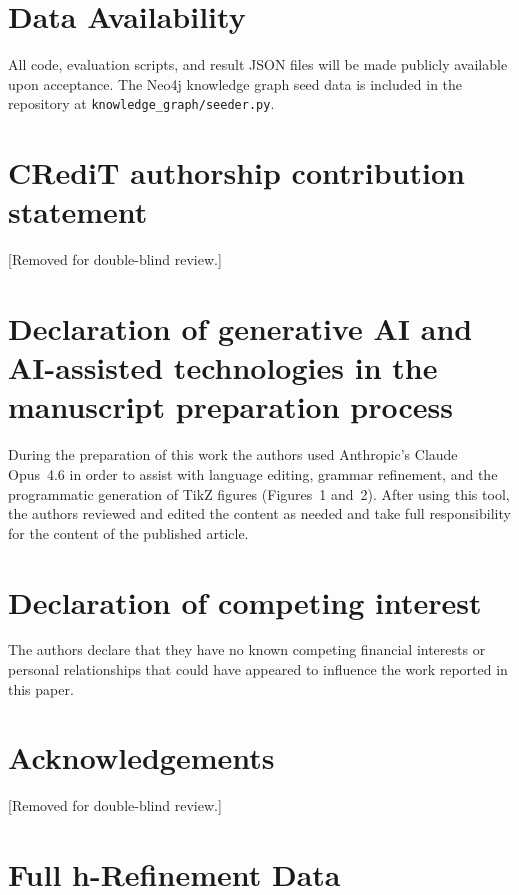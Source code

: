 \documentclass[preprint,review,12pt]{elsarticle}
\begin{document}
\section*{Data Availability}
All code, evaluation scripts, and result JSON files will be made publicly
available upon acceptance.  The Neo4j knowledge graph seed data is included
in the repository at \texttt{knowledge\_graph/seeder.py}.

\section*{CRediT authorship contribution statement}
[Removed for double-blind review.]

\section*{Declaration of generative AI and AI-assisted technologies in the manuscript preparation process}
During the preparation of this work the authors used Anthropic's Claude
Opus~4.6 in order to assist with language editing, grammar refinement,
and the programmatic generation of TikZ figures (Figures~1 and~2).
After using this tool, the authors reviewed and edited the content as
needed and take full responsibility for the content of the published
article.

\section*{Declaration of competing interest}
The authors declare that they have no known competing financial interests
or personal relationships that could have appeared to influence the work
reported in this paper.

\section*{Acknowledgements}
[Removed for double-blind review.]




\appendix

\section{Full h-Refinement Data}
\label{app:vv-detail}
\end{document}
